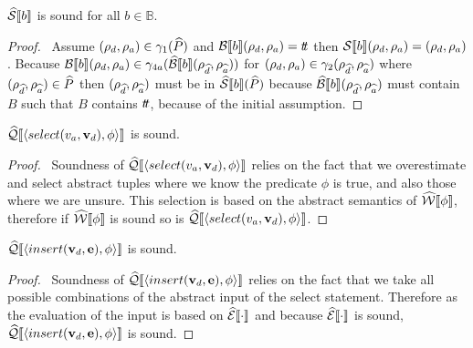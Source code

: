 \begin{conjecture}\label{thm:sound-boolsem}
    $\widehat{\mathcal{S}} \llbracket b \rrbracket$ is sound for all $b \in \mathbb{B}$.
\end{conjecture}
\begin{proof}
    \pf\
    Assume $(\rho_{d}, \rho_{a}) \in \gamma_1(\widehat{P})$ and $\mathcal{B}\llbracket b \rrbracket(\rho_{d}, \rho_{a}) = t\!t$ then $\mathcal{S} \llbracket b \rrbracket(\rho_{d}, \rho_{a}) = (\rho_{d}, \rho_{a})$.
    Because $\mathcal{B}\llbracket b \rrbracket(\rho_{d}, \rho_{a}) \in \gamma_{4a}(\widehat{\mathcal{B}}\llbracket b \rrbracket(\rho_{\widehat{d}}, \rho_{\widehat{a}}))$ for $(\rho_{d}, \rho_{a}) \in \gamma_2(\rho_{\widehat{d}}, \rho_{\widehat{a}})$ where $(\rho_{\widehat{d}}, \rho_{\widehat{a}}) \in \widehat{P}$ then $(\rho_{\widehat{d}}, \rho_{\widehat{a}})$ must be in $\widehat{\mathcal{S}} \llbracket b \rrbracket(\widehat{P})$ because $\widehat{\mathcal{B}}\llbracket b \rrbracket(\rho_{\widehat{d}}, \rho_{\widehat{a}})$ must contain $B$ such that $B$ contains $t\!t$, because of the initial assumption.
\end{proof}

\begin{conjecture}\label{thm:sound-select}
    $\widehat{\mathcal{Q}}\llbracket \langle select(v_a, \mathbf{v}_d), \phi \rangle \rrbracket$ is sound.
\end{conjecture}
\begin{proof}
    \pfsketch\
    Soundness of $\widehat{\mathcal{Q}}\llbracket \langle select(v_a, \mathbf{v}_d), \phi \rangle \rrbracket$ relies on the fact that we overestimate and select abstract tuples where we know the predicate $\phi$ is true, and also those where we are unsure.
    This selection is based on the abstract semantics of $\widehat{\mathcal{W}}\llbracket \phi \rrbracket$, therefore if $\widehat{\mathcal{W}}\llbracket \phi \rrbracket$ is sound so is $\widehat{\mathcal{Q}}\llbracket \langle select(v_a, \mathbf{v}_d), \phi \rangle \rrbracket$.
\end{proof}

\begin{conjecture}\label{thm:sound-insert}
    $\widehat{\mathcal{Q}}\llbracket \langle insert(\mathbf{v}_d, \mathbf{e}), \phi \rangle \rrbracket$ is sound.
\end{conjecture}
\begin{proof}
    \pfsketch\
    Soundness of $\widehat{\mathcal{Q}}\llbracket \langle insert(\mathbf{v}_d, \mathbf{e}), \phi \rangle \rrbracket$ relies on the fact that we take all possible combinations of the abstract input of the select statement.
    Therefore as the evaluation of the input is based on $\widehat{\mathcal{E}}\llbracket \cdot \rrbracket$ and because $\widehat{\mathcal{E}}\llbracket \cdot \rrbracket$ is sound, $\widehat{\mathcal{Q}}\llbracket \langle insert(\mathbf{v}_d, \mathbf{e}), \phi \rangle \rrbracket$ is sound.
\end{proof}

